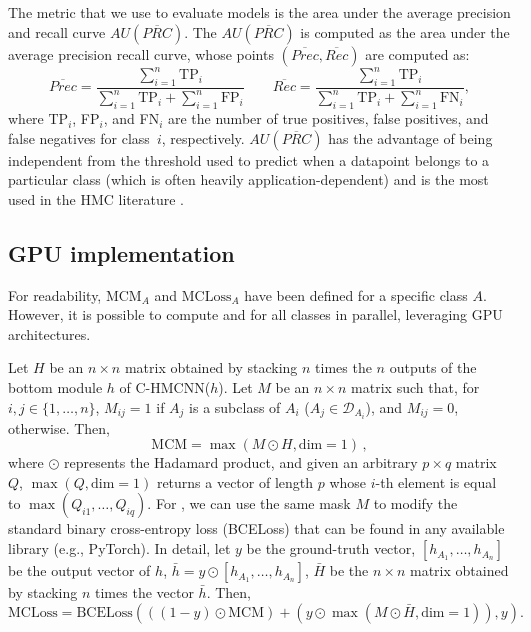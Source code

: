\documentclass{article}
\newcommand{\module}{\text{MCM}}
\newcommand{\loss}{\text{MCLoss}}
\newcommand{\system}[1]{C-HMCNN(#1)}
\newcommand{\auprc}{$AU(\overline{PRC}) $}
\begin{document}
The metric that we use to evaluate models is the area under the average precision and recall curve \auprc. The \auprc{} is computed as the area under the average precision recall curve, whose points $(\overline{Prec}, \overline{Rec})$ are computed as:
$$
\overline{Prec}=\frac{\sum_{i=1}^n \text{TP}_i}{\sum_{i=1}^n \text{TP}_i + \sum_{i=1}^n \text{FP}_i} \qquad \overline{Rec}=\frac{\sum_{i=1}^n \text{TP}_i}{\sum_{i=1}^n \text{TP}_i + \sum_{i=1}^n \text{FN}_i},
$$
where TP$_i$, FP$_i$, and FN$_i$ are the number of true positives, false positives, and false negatives for class~$i$, respectively.
\auprc{}  has the advantage of being independent from the threshold used to predict when a datapoint belongs to a particular class (which is often heavily application-dependent) and is the most used in the HMC literature \citep{kwok2011,vens2008,cerri2018}.



\subsection{GPU implementation}

For readability, $\module_A$ and $\loss_A$ have been defined for a specific class $A$. However, it is possible to compute  \module{} and \loss{} for all classes in parallel, 
leveraging GPU architectures.


 Let $H$ be an $n \times n$ matrix obtained by stacking $n$ times the $n$ outputs of the bottom module $h$ of \system{$h$}. Let $M$ be an $n \times n$ matrix such that, for $i,j \in\{ 1, \ldots, n\}$, $M_{ij} = 1$ if $A_j$ is a subclass of $A_i$ ($A_j\in \mathcal{D}_{A_i}$), and $M_{ij} = 0$, otherwise. Then, 
$$
\module = \max(M \odot H, \text{dim}=1)\,,
$$
where $\odot$ represents the Hadamard product, and given an arbitrary $p \times q$ matrix $Q$, $\max(Q, \text{dim}=1)$ returns a vector of length $p$ whose $i$-th element is equal to $\max(Q_{i1}, \ldots, Q_{iq})$. For \loss{}, we can use the same mask $M$ to modify the standard binary cross-entropy loss (BCELoss) that can be found in any available library (e.g., PyTorch). In detail, let $y$ be the ground-truth vector, $[h_{A_1}, \ldots, h_{A_n}]$ be the output vector of $h$, $\bar h = y \odot [h_{A_1}, \ldots, h_{A_n}]$, $\bar H$ be the $n \times n$ matrix obtained by stacking $n$ times the vector $\bar h$. Then, 
$$
\loss = \text{BCELoss}(((1-y) \odot \module)+(y \odot \max(M \odot \bar H, \text{dim}=1)),y).
$$
\end{document}
